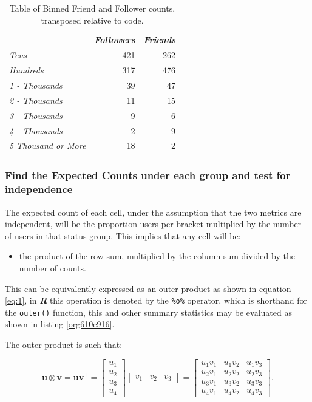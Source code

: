 \documentclass[11pt]{article}
\begin{document}
\begin{table}[htbp]
\caption{\label{tab:org9c45940}Table of Binned Friend and Follower counts, transposed relative to code.}
\centering
\begin{tabular}{lrr}
 & \textbf{\textbf{\emph{Followers}}} & \textbf{\textbf{\emph{Friends}}}\\
\emph{Tens} & 421 & 262\\
\emph{Hundreds} & 317 & 476\\
\emph{1 - Thousands} & 39 & 47\\
\emph{2 - Thousands} & 11 & 15\\
\emph{3 - Thousands} & 9 & 6\\
\emph{4 - Thousands} & 2 & 9\\
\emph{5 Thousand or More} & 18 & 2\\
\end{tabular}
\end{table}

\subsubsection{Find the Expected Counts under each group and test for independence}
\label{sec:org15aa7b6}
The expected count of each cell, under the assumption that the two metrics are
independent, will be the proportion users per bracket multiplied by the number
of users in that status group. This implies that any cell will be:

\begin{itemize}
\item the product of the row sum, multiplied by the column sum divided by the number of counts.
\end{itemize}

This can be equivalently expressed as an outer product as shown in equation
\eqref{eq:1}, in \textbf{\emph{R}} this operation is denoted by the \texttt{\%o\%} operator, which is
shorthand for the \texttt{outer()} function, this and other summary statistics may be
evaluated as shown in listing \ref{org610e916}.

The outer product is such that:


$$
\mathbf{u} \otimes \mathbf {v} =\mathbf {u} \mathbf {v} ^{\textsf {T}}={\begin{bmatrix}u_{1}\\u_{2}\\u_{3}\\u_{4}\end{bmatrix}}{\begin{bmatrix}v_{1}&v_{2}&v_{3}\end{bmatrix}}={\begin{bmatrix}u_{1}v_{1}&u_{1}v_{2}&u_{1}v_{3}\\u_{2}v_{1}&u_{2}v_{2}&u_{2}v_{3}\\u_{3}v_{1}&u_{3}v_{2}&u_{3}v_{3}\\u_{4}v_{1}&u_{4}v_{2}&u_{4}v_{3}\end{bmatrix}}.
$$
\end{document}
